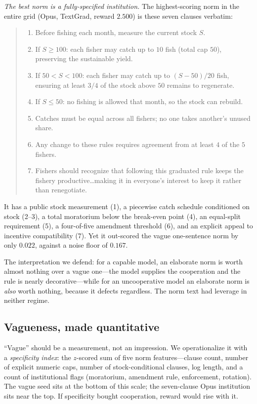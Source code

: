 \documentclass[11pt]{article}
\begin{document}
\emph{The best norm is a fully-specified institution.} The highest-scoring norm in
the entire grid (Opus, TextGrad, reward $2.500$) is these seven clauses verbatim:
\begin{quote}\small\itshape
\begin{enumerate}\setlength{\itemsep}{0pt}
  \item Before fishing each month, measure the current stock $S$.
  \item If $S \ge 100$: each fisher may catch up to $10$ fish (total cap $50$),
  preserving the sustainable yield.
  \item If $50 < S < 100$: each fisher may catch up to $(S-50)/20$ fish, ensuring
  at least $3/4$ of the stock above $50$ remains to regenerate.
  \item If $S \le 50$: no fishing is allowed that month, so the stock can rebuild.
  \item Catches must be equal across all fishers; no one takes another's unused share.
  \item Any change to these rules requires agreement from at least $4$ of the $5$ fishers.
  \item Fishers should recognize that following this graduated rule keeps the fishery
  productive\ldots making it in everyone's interest to keep it rather than renegotiate.
\end{enumerate}
\end{quote}
It has a public stock measurement (1), a piecewise catch schedule conditioned on
stock (2--3), a total moratorium below the break-even point (4), an equal-split
requirement (5), a four-of-five amendment threshold (6), and an explicit appeal to
incentive compatibility (7). Yet it out-scored the vague one-sentence norm by only
$0.022$, against a noise floor of $0.167$.

The interpretation we defend: for a capable model, an elaborate norm is worth
almost nothing over a vague one---the model supplies the cooperation and the rule
is nearly decorative---while for an uncooperative model an elaborate norm is
\emph{also} worth nothing, because it defects regardless. The norm text had
leverage in neither regime.

\subsection{Vagueness, made quantitative}
``Vague'' should be a measurement, not an impression. We operationalize it with a
\emph{specificity index}: the $z$-scored sum of five norm features---clause count,
number of explicit numeric caps, number of stock-conditional clauses, log length,
and a count of institutional flags (moratorium, amendment rule, enforcement,
rotation). The vague seed sits at the bottom of this scale; the seven-clause Opus
institution sits near the top. If specificity bought cooperation, reward would rise
with it.
\end{document}

